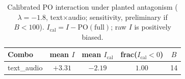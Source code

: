 \begin{table}[t]
\centering\small\setlength{\tabcolsep}{5pt}
\caption{Calibrated PO interaction under planted antagonism
  ($\lambda=-1.8$, text$\times$audio; sensitivity, preliminary if $B<100$).
  $I_{\mathrm{cal}}=I-\mathrm{PO}(\mathrm{full})$; raw $I$ is positively biased.}
\label{tab:delivery-po-signed}
\begin{tabular}{l cccc}
\toprule
Combo & mean $I$ & mean $I_{\mathrm{cal}}$ & frac($I_{\mathrm{cal}}<0$) & $B$ \\
\midrule
text\_audio & $+3.31$ & $-2.19$ & $1.00$ & 14 \\
\bottomrule
\end{tabular}
\end{table}
